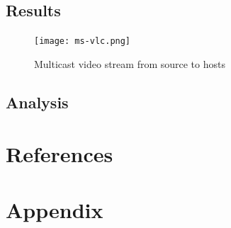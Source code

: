 \documentclass{article}
\begin{document}
\newpage    
\subsection{Results}
	\begin{figure}[h]
		\centering
		\texttt{[image: ms-vlc.png]}
		\caption{Multicast video stream from source to hosts}
		\label{fig:t4-3}
	\end{figure}

\newpage
\subsection{Analysis}

\newpage
\section{References}



\newpage
\section{Appendix}
\renewcommand{\thesection}{\alph{section}}
\setcounter{section}{0}
\end{document}
